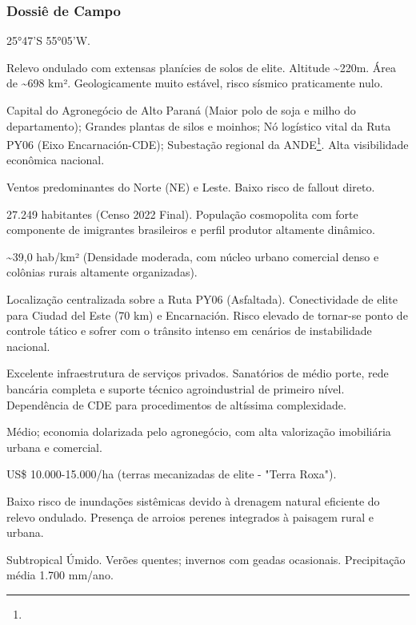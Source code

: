 \subsubsection{Dossiê de Campo}
\begin{description}[style=nextline,leftmargin=0.5cm,font=\bfseries]
\item[Coordenadas]  25°47'S 55°05'W.
\item[Topografia]  Relevo ondulado com extensas planícies de solos de elite. Altitude \textasciitilde 220m. Área de \textasciitilde 698 km². Geologicamente muito estável, risco sísmico praticamente nulo.
\item[Alvos Estratégicos]  Capital do Agronegócio de Alto Paraná (Maior polo de soja e milho do departamento); Grandes plantas de silos e moinhos; Nó logístico vital da Ruta PY06 (Eixo Encarnación-CDE); Subestação regional da ANDE\footnote{\fineANDE}. Alta visibilidade econômica nacional.
\item[Fallout]  Ventos predominantes do Norte (NE) e Leste. Baixo risco de fallout direto.
\item[População]  27.249 habitantes (Censo 2022 Final). População cosmopolita com forte componente de imigrantes brasileiros e perfil produtor altamente dinâmico.
\item[Densidade]  \textasciitilde 39,0 hab/\allowbreak km² (Densidade moderada, com núcleo urbano comercial denso e colônias rurais altamente organizadas).
\item[Vias de Acesso]  Localização centralizada sobre a Ruta PY06 (Asfaltada). Conectividade de elite para Ciudad del Este (70 km) e Encarnación. Risco elevado de tornar-se ponto de controle tático e sofrer com o trânsito intenso em cenários de instabilidade nacional.
\item[Serviços]  Excelente infraestrutura de serviços privados. Sanatórios de médio porte, rede bancária completa e suporte técnico agroindustrial de primeiro nível. Dependência de CDE para procedimentos de altíssima complexidade.
\item[Custo de Vida]  Médio; economia dolarizada pelo agronegócio, com alta valorização imobiliária urbana e comercial.
\item[Preço da Terra]  US\$ 10.000-15.000/\allowbreak ha (terras mecanizadas de elite - "Terra Roxa").
\item[Hidrologia]  Baixo risco de inundações sistêmicas devido à drenagem natural eficiente do relevo ondulado. Presença de arroios perenes integrados à paisagem rural e urbana.
\item[Clima]  Subtropical Úmido. Verões quentes; invernos com geadas ocasionais. Precipitação média 1.700 mm/\allowbreak ano.

\end{description}
